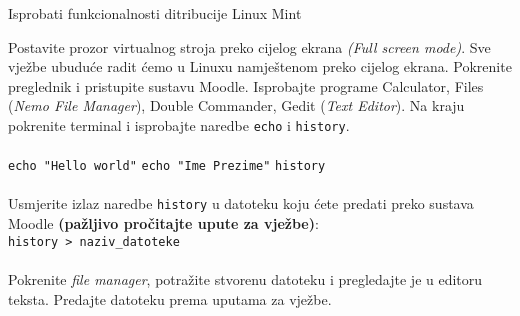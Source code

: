  \begin{zadatak} Isprobati funkcionalnosti ditribucije Linux Mint

Postavite prozor virtualnog stroja preko cijelog ekrana \textit{(Full screen mode)}. Sve vježbe ubuduće radit ćemo u Linuxu namještenom preko cijelog ekrana. Pokrenite preglednik i pristupite sustavu Moodle. Isprobajte programe Calculator, Files (\textit{Nemo File Manager}), Double Commander, Gedit (\textit{Text Editor}). Na kraju pokrenite terminal i isprobajte naredbe \texttt{echo} i \texttt{history}.
\\
\\
\texttt{echo "Hello world"}\break
\texttt{echo "Ime Prezime"}\break
\texttt{history}
\\
\\
Usmjerite izlaz naredbe \texttt{history} u datoteku koju ćete predati preko sustava Moodle \textbf{(pažljivo pročitajte upute za vježbe)}:\\
\texttt{history  \textgreater \  naziv\_datoteke}
\\
\\
Pokrenite \textit{file manager}, potražite stvorenu datoteku i pregledajte je u editoru teksta.
Predajte datoteku prema uputama za vježbe. 

\end{zadatak}